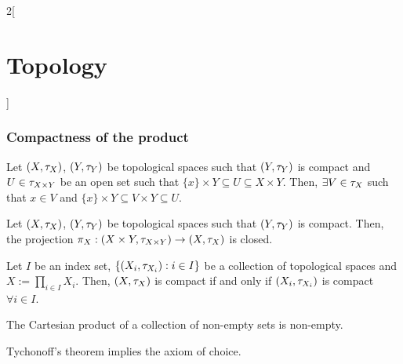 \documentclass[../../../main.tex]{subfiles}
\begin{document}
\begin{multicols}{2}[\section{Topology}]
  \subsubsection{Compactness of the product}
  \begin{lemma}
    Let $(X,\tau_X)$, $(Y,\tau_Y)$ be topological spaces such that $(Y,\tau_Y)$ is compact and $U\in\tau_{X\times Y}$ be an open set such that $\{x\}\times Y\subseteq U\subseteq X\times Y$. Then, $\exists V\in\tau_X$ such that $x\in V$ and $\{x\}\times Y\subseteq V\times Y\subseteq U$.
  \end{lemma}
  \begin{corollary}
    Let $(X,\tau_X)$, $(Y,\tau_Y)$ be topological spaces such that $(Y,\tau_Y)$ is compact. Then, the projection $\pi_X:(X\times Y,\tau_{X\times Y})\rightarrow (X,\tau_X)$ is closed.
  \end{corollary}
  \begin{theorem}
    Let $I$ be an index set, $\{(X_i,\tau_{X_i}):i\in I\}$ be a collection of topological spaces and $X:=\prod_{i\in I}X_i$. Then, $(X,\tau_X)$ is compact if and only if $(X_i,\tau_{X_i})$ is compact $\forall i\in I$.
  \end{theorem}
  \begin{axiom}
    The Cartesian product of a collection of non-empty sets is non-empty.
  \end{axiom}
  \begin{theorem}
    Tychonoff's theorem implies the axiom of choice.
  \end{theorem}

\end{multicols}
\end{document}

